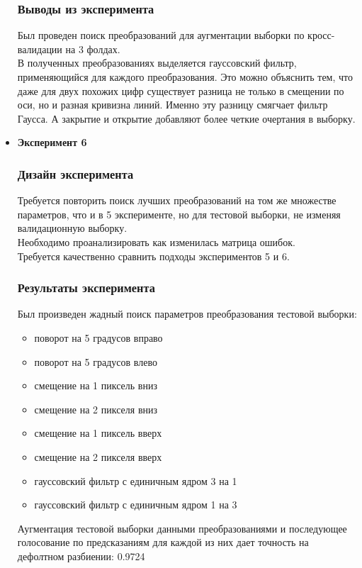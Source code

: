 \documentclass[10pt]{article}
\begin{document}
\begin{itemize}
		    \subsubsection*{Выводы из эксперимента}
		    {
		    	Был проведен поиск преобразований для аугментации выборки по кросс-валидации на 3 фолдах.\\
		    	В полученных преобразованиях выделяется гауссовский фильтр, применяющийся для каждого преобразования. Это можно объяснить тем, что даже для двух похожих цифр существует разница не только в смещении по оси, но и разная кривизна линий. Именно эту разницу смягчает фильтр Гаусса. А закрытие и открытие добавляют более четкие очертания в выборку.
		    }
			
		\item {\bf Эксперимент 6}
		    \subsubsection*{Дизайн эксперимента}
		    {
		    	Требуется повторить поиск лучших преобразований на том же множестве параметров, что и в 5 эксперименте, но для тестовой выборки, не изменяя валидационную выборку.\\
		    	Необходимо проанализировать как изменилась матрица ошибок.\\
		    	Требуется качественно сравнить подходы экспериментов 5 и 6.
		    }
		    
		    \subsubsection*{Результаты эксперимента}
		    {
		    	Был произведен жадный поиск параметров преобразования тестовой выборки:
		    	\begin{itemize}
		    		\item поворот на 5 градусов вправо
		    		\item поворот на 5 градусов влево
		    		\item смещение на 1 пиксель вниз
		    		\item смещение на 2 пикселя вниз
		    		\item смещение на 1 пиксель вверх
		    		\item смещение на 2 пикселя вверх
		    		\item гауссовский фильтр с единичным ядром 3 на 1
		    		\item гауссовский фильтр с единичным ядром 1 на 3
		    	\end{itemize}
	    	    Аугментация тестовой выборки данными преобразованиями и последующее голосование по предсказаниям для каждой из них дает точность на дефолтном разбиении: 0.9724
	    	  
}
\end{itemize}
\end{document}
